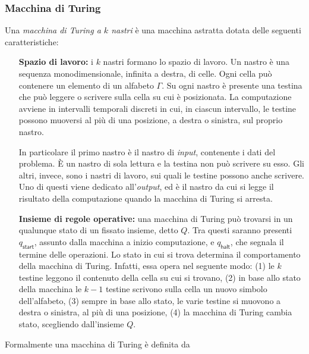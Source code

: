 \subsubsection{Macchina di Turing}
Una \textit{macchina di Turing a $k$ nastri} è una macchina astratta dotata delle seguenti caratteristiche:
\begin{enumerate}[align=left]
 \item[\textbf{Spazio di lavoro:}] i $k$ nastri formano lo spazio di lavoro. Un nastro è una sequenza monodimensionale, infinita a destra, di celle. 
 Ogni cella può contenere un elemento di un alfabeto $\Gamma$.
 Su ogni nastro è presente una testina che può leggere o scrivere sulla cella su cui è posizionata. 
 La computazione avviene in intervalli temporali discreti in cui, in ciascun intervallo, le testine possono muoversi al più di una posizione, a destra o sinistra, sul proprio nastro.
 
 In particolare il primo nastro è il nastro di \textit{input}, contenente i dati del problema. 
 È un nastro di sola lettura e la testina non può scrivere su esso.
 Gli altri, invece, sono i nastri di lavoro, sui quali le testine possono anche scrivere.
 Uno di questi viene dedicato all'\textit{output}, ed è il nastro da cui si legge il risultato della computazione quando la macchina di Turing si arresta.
 
 \item[\textbf{Insieme di regole operative:}] una macchina di Turing può trovarsi in un qualunque stato di un fissato insieme, detto $Q$. 
 Tra questi saranno presenti $q_{\mathsf{start}}$, assunto dalla macchina a inizio computazione, e $q_{\mathsf{halt}}$, che segnala il termine delle operazioni.
 Lo stato in cui si trova determina il comportamento della macchina di Turing.
 Infatti, essa opera nel seguente modo: 
 (1) le $k$ testine leggono il contenuto della cella su cui si trovano, 
 (2) in base allo stato della macchina le $k-1$ testine scrivono sulla cella un nuovo simbolo dell'alfabeto,
 (3) sempre in base allo stato, le varie testine si muovono a destra o sinistra, al più di una posizione,
 (4) la macchina di Turing cambia stato, scegliendo dall'insieme $Q$.
\end{enumerate}
Formalmente una macchina di Turing è definita da
